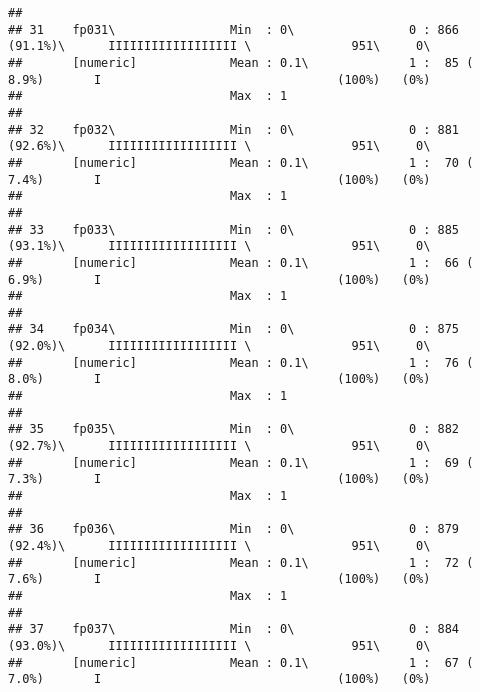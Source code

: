 \documentclass[]{article}
\begin{document}
\begin{verbatim}
## 
## 31    fp031\                Min  : 0\                0 : 866 (91.1%)\      IIIIIIIIIIIIIIIIII \              951\     0\       
##       [numeric]             Mean : 0.1\              1 :  85 ( 8.9%)       I                                 (100%)   (0%)     
##                             Max  : 1                                                                                           
## 
## 32    fp032\                Min  : 0\                0 : 881 (92.6%)\      IIIIIIIIIIIIIIIIII \              951\     0\       
##       [numeric]             Mean : 0.1\              1 :  70 ( 7.4%)       I                                 (100%)   (0%)     
##                             Max  : 1                                                                                           
## 
## 33    fp033\                Min  : 0\                0 : 885 (93.1%)\      IIIIIIIIIIIIIIIIII \              951\     0\       
##       [numeric]             Mean : 0.1\              1 :  66 ( 6.9%)       I                                 (100%)   (0%)     
##                             Max  : 1                                                                                           
## 
## 34    fp034\                Min  : 0\                0 : 875 (92.0%)\      IIIIIIIIIIIIIIIIII \              951\     0\       
##       [numeric]             Mean : 0.1\              1 :  76 ( 8.0%)       I                                 (100%)   (0%)     
##                             Max  : 1                                                                                           
## 
## 35    fp035\                Min  : 0\                0 : 882 (92.7%)\      IIIIIIIIIIIIIIIIII \              951\     0\       
##       [numeric]             Mean : 0.1\              1 :  69 ( 7.3%)       I                                 (100%)   (0%)     
##                             Max  : 1                                                                                           
## 
## 36    fp036\                Min  : 0\                0 : 879 (92.4%)\      IIIIIIIIIIIIIIIIII \              951\     0\       
##       [numeric]             Mean : 0.1\              1 :  72 ( 7.6%)       I                                 (100%)   (0%)     
##                             Max  : 1                                                                                           
## 
## 37    fp037\                Min  : 0\                0 : 884 (93.0%)\      IIIIIIIIIIIIIIIIII \              951\     0\       
##       [numeric]             Mean : 0.1\              1 :  67 ( 7.0%)       I                                 (100%)   (0%)     

\end{verbatim}
\end{document}
